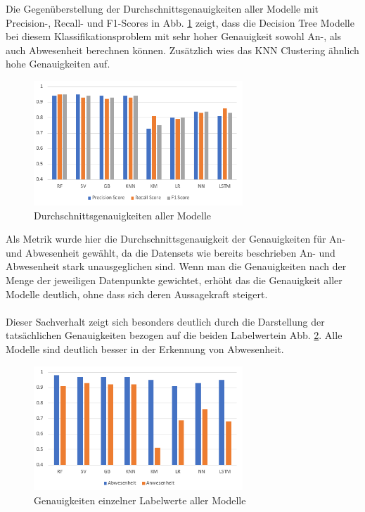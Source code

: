 \newpage

Die Gegenüberstellung der Durchschnittsgenauigkeiten aller Modelle mit Precision-, Recall- und F1-Scores in 
Abb. \ref{fig:ResAll}  zeigt, dass die Decision Tree Modelle bei diesem Klassifikationsproblem mit sehr hoher
Genauigkeit sowohl An-, als auch Abwesenheit berechnen können. Zusätzlich wies das KNN Clustering ähnlich
hohe Genauigkeiten auf.
\begin{figure}[h]
    \centering
    \includegraphics[width=0.7\textwidth]{pic/results_all.png}
    \caption{Durchschnittsgenauigkeiten aller Modelle}
    \label{fig:ResAll}
\end{figure}

Als Metrik wurde hier die Durchschnittsgenauigkeit der Genauigkeiten für An- und Abwesenheit gewählt, da die 
Datensets wie bereits beschrieben An- und Abwesenheit stark unausgeglichen sind. Wenn man die Genauigkeiten
nach der Menge der jeweiligen Datenpunkte gewichtet, erhöht das die Genauigkeit aller Modelle deutlich,
ohne dass sich deren Aussagekraft steigert.\\\\ 
Dieser Sachverhalt zeigt sich besonders deutlich durch die Darstellung der tatsächlichen Genauigkeiten bezogen 
auf die beiden Labelwertein Abb. \ref{fig:ResSpec}. Alle Modelle sind deutlich besser in der Erkennung von 
Abwesenheit.

\begin{figure}[h]
    \centering
    \includegraphics[width=0.7\textwidth]{pic/results_spec.png}
    \caption{Genauigkeiten einzelner Labelwerte aller Modelle}
    \label{fig:ResSpec}
\end{figure}

